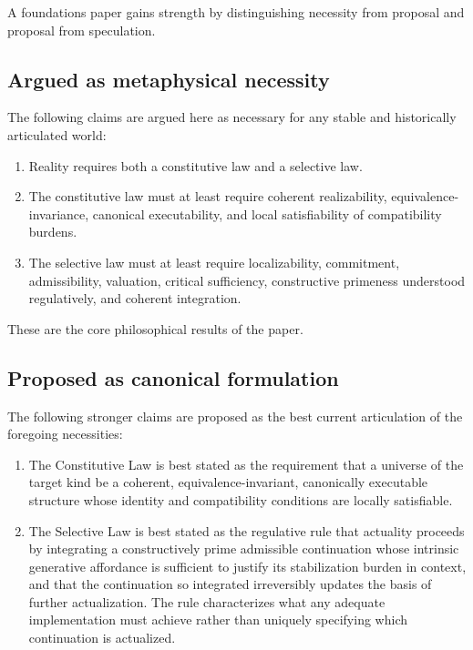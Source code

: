 \documentclass[11pt]{article}
\theoremstyle{foundation}
\begin{document}
A foundations paper gains strength by distinguishing necessity from proposal and proposal from speculation.

\subsection{Argued as metaphysical necessity}

The following claims are argued here as necessary for any stable and historically articulated world:

\begin{enumerate}
    \item Reality requires both a constitutive law and a selective law.
    \item The constitutive law must at least require coherent realizability, equivalence-invariance, canonical executability, and local satisfiability of compatibility burdens.
    \item The selective law must at least require localizability, commitment, admissibility, valuation, critical sufficiency, constructive primeness understood regulatively, and coherent integration.
\end{enumerate}

These are the core philosophical results of the paper.

\subsection{Proposed as canonical formulation}

The following stronger claims are proposed as the best current articulation of the foregoing necessities:

\begin{enumerate}
    \item The Constitutive Law is best stated as the requirement that a universe of the target kind be a coherent, equivalence-invariant, canonically executable structure whose identity and compatibility conditions are locally satisfiable.
    \item The Selective Law is best stated as the regulative rule that actuality proceeds by integrating a constructively prime admissible continuation whose intrinsic generative affordance is sufficient to justify its stabilization burden in context, and that the continuation so integrated irreversibly updates the basis of further actualization. The rule characterizes what any adequate implementation must achieve rather than uniquely specifying which continuation is actualized.
\end{enumerate}
\end{document}

